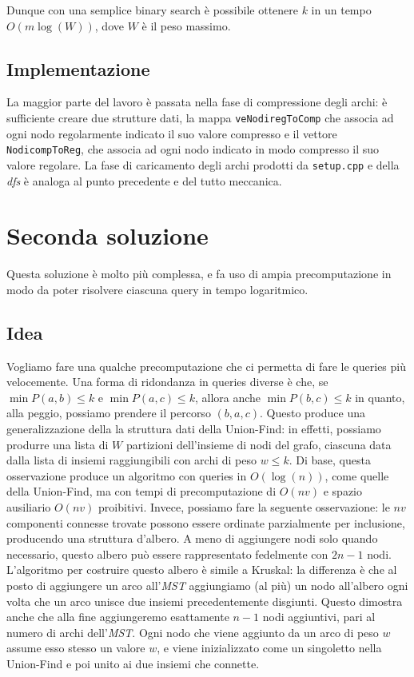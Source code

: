 \documentclass[a4paper]{article}
\begin{document}
Dunque con una semplice binary search è possibile ottenere $k$ in un tempo $O(m\log(W))$, dove $W$ è il peso massimo.

\subsection{Implementazione}
La maggior parte del lavoro è passata nella fase di compressione degli archi: è sufficiente creare due strutture dati, la mappa \texttt{veNodiregToComp} che associa ad ogni nodo regolarmente indicato il suo valore compresso e il vettore \texttt{NodicompToReg}, che associa ad ogni nodo indicato in modo compresso il suo valore regolare.
La fase di caricamento degli archi prodotti da \texttt{setup.cpp} e della \textit{dfs} è analoga al punto precedente e del tutto meccanica.

\section{Seconda soluzione}
Questa soluzione è molto più complessa, e fa uso di ampia precomputazione in modo da poter risolvere ciascuna query in tempo logaritmico.
\subsection{Idea}
Vogliamo fare una qualche precomputazione che ci permetta di fare le queries più velocemente. Una forma di ridondanza in queries diverse è che, se $\min P(a,b)\le k$ e $\min P(a,c)\le k$, allora anche $\min P(b,c)\le k$ in quanto, alla peggio, possiamo prendere il percorso $(b,a,c)$. 
Questo produce una generalizzazione della la struttura dati della Union-Find: in effetti, possiamo produrre una lista di $W$ partizioni dell'insieme di nodi del grafo, ciascuna data dalla lista di insiemi raggiungibili con archi di peso $w \le k$.
Di base, questa osservazione produce un algoritmo con queries in $O(\log(n))$, come quelle della Union-Find, ma con tempi di precomputazione di $O(nv)$ e spazio ausiliario $O(nv)$ proibitivi. 
Invece, possiamo fare la seguente osservazione: le $nv$ componenti connesse trovate possono essere ordinate parzialmente per inclusione, producendo una struttura d'albero. A meno di aggiungere nodi solo quando necessario, questo albero può essere rappresentato fedelmente con $2n-1$ nodi.
L'algoritmo per costruire questo albero è simile a Kruskal: la differenza è che al posto di aggiungere un arco all'\textit{MST} aggiungiamo (al più) un nodo all'albero ogni volta che un arco unisce due insiemi precedentemente disgiunti. Questo dimostra anche che alla fine aggiungeremo esattamente $n-1$ nodi aggiuntivi, pari al numero di archi dell'\textit{MST}. Ogni nodo che viene aggiunto da un arco di peso $w$ assume esso stesso un valore $w$, e viene inizializzato come un singoletto nella Union-Find e poi unito ai due insiemi che connette.
\end{document}
